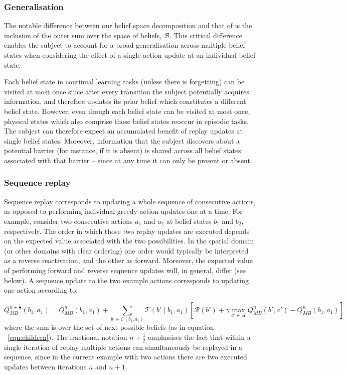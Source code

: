 \subsubsection*{Generalisation}
The notable difference between our belief space decomposition and that of \textcite{mattarPrioritizedMemoryAccess2018} is the inclusion of the outer sum over the space of beliefs, $\mathcal{B}$. This critical difference enables the subject to account for a broad generalisation across multiple belief states when considering the effect of a single action update at an individual belief state. 

Each belief state in continual learning tasks (unless there is forgetting) can be visited at most once since after every transition the subject potentially acquires information, and therefore updates its prior belief which constitutes a different belief state. However, even though each belief state can be visited at most once, physical states which also comprise those belief states reoccur in episodic tasks. The subject can therefore expect an accumulated benefit of replay updates at single belief states. Moreover, information that the subject discovers about a potential barrier (for instance, if it is absent) is shared across all belief states associated with that barrier -- since at any time it can only be present or absent. 

\subsubsection*{Sequence replay}

Sequence replay corresponds to updating a whole sequence of consecutive actions, as opposed to performing individual greedy action updates one at a time. For example, consider two consecutive actions $a_1$ and $a_2$ at belief states $b_1$ and $b_2$, respectively. The order in which those two replay updates are executed depends on the expected value associated with the two possibilities. In the spatial domain (or other domains with clear ordering) one order would typically be interpreted as a reverse reactivation, and the other as forward. Moreover, the expected value of performing forward and reverse sequence updates will, in general, differ (see below). A sequence update to the two example actions corresponds to updating one action according to:

\begin{equation}
    Q_{MB}^{n+\frac{1}{2}}(b_1, a_1) = Q_{MB}^n(b_1, a_1) + \sum_{b' \in C(b_1, a_1)} \mathcal{T}(b'\mid b_1, a_1)\left[ \mathcal{R}(b') + \gamma \max_{a'\in\mathcal{A}} Q_{MB}^n(b', a') - Q_{MB}^n(b_1, a_1) \right]
\end{equation}
where the sum is over the set of next possible beliefs (as in equation ~\ref{eqn:children}). The fractional notation $n+\frac{1}{2}$ emphasises the fact that within a single iteration of replay multiple actions can simultaneously be replayed in a sequence, since in the current example with two actions there are two executed updates between iterations $n$ and $n+1$.

